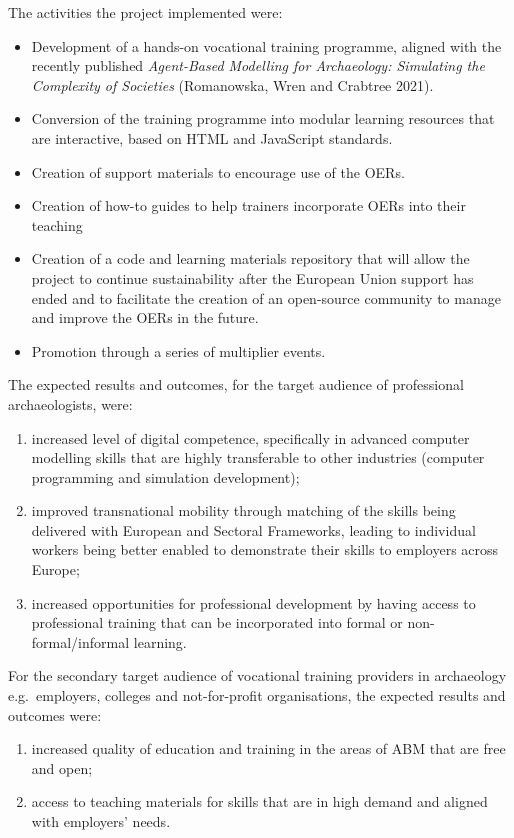 \documentclass[
]{article}
\begin{document}
The activities the project implemented were:

\begin{itemize}
\item
  Development of a hands-on vocational training programme, aligned with the recently published \emph{Agent-Based Modelling for Archaeology: Simulating the Complexity of Societies} (Romanowska, Wren and Crabtree 2021).
\item
  Conversion of the training programme into modular learning resources that are interactive, based on HTML and JavaScript standards.
\item
  Creation of support materials to encourage use of the OERs.
\item
  Creation of how-to guides to help trainers incorporate OERs into their teaching
\item
  Creation of a code and learning materials repository that will allow the project to continue sustainability after the European Union support has ended and to facilitate the creation of an open-source community to manage and improve the OERs in the future.
\item
  Promotion through a series of multiplier events.
\end{itemize}

The expected results and outcomes, for the target audience of professional archaeologists, were:

\begin{enumerate}
\def\labelenumi{\arabic{enumi}.}
\item
  increased level of digital competence, specifically in advanced computer modelling skills that are highly transferable to other industries (computer programming and simulation development);
\item
  improved transnational mobility through matching of the skills being delivered with European and Sectoral Frameworks, leading to individual workers being better enabled to demonstrate their skills to employers across Europe;
\item
  increased opportunities for professional development by having access to professional training that can be incorporated into formal or non-formal/informal learning.
\end{enumerate}

For the secondary target audience of vocational training providers in archaeology e.g.~employers, colleges and not-for-profit organisations, the expected results and outcomes were:

\begin{enumerate}
\def\labelenumi{\arabic{enumi}.}
\item
  increased quality of education and training in the areas of ABM that are free and open;
\item
  access to teaching materials for skills that are in high demand and aligned with employers' needs.
\end{enumerate}
\end{document}
